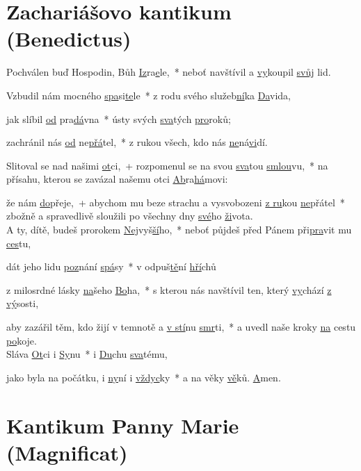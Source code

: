 \documentclass[12pt, a4paper]{article}
\begin{document}
\section*{Zachariášovo kantikum (Benedictus)}

Pochválen buď Hospodin, Bůh \underline{Iz}ra\underline{e}le,~* neboť navštívil a \underline{vy}koupil \underline{svůj} lid.

Vzbudil nám mocného \underline{spa}si\underline{te}le~* z rodu svého služeb\underline{ní}ka \underline{Da}vida,

jak slíbil \underline{od} pra\underline{dá}vna~* ústy svých \underline{sva}tých \underline{pro}roků;

zachránil nás \underline{od} ne\underline{přá}tel,~* z rukou všech, kdo nás \underline{ne}ná\underline{vi}dí.

Slitoval se nad našimi \underline{ot}ci,~+ rozpomenul se na svou \underline{sva}tou \underline{smlou}vu,~* na přísahu, kterou se zavázal našemu otci \underline{Ab}ra\underline{há}movi:

že nám \underline{do}přeje,~+ abychom mu beze strachu a vysvobozeni \underline{z ru}kou \underline{ne}přátel~* zbožně a spravedlivě sloužili po všechny dny \underline{své}ho \underline{ži}vota.\\



A ty, dítě, budeš prorokem \underline{Nej}vyš\underline{ší}ho,~* neboť půjdeš před Pánem při\underline{pra}vit mu \underline{ces}tu,

dát jeho lidu \underline{poz}nání \underline{spá}sy~* v odpuš\underline{tě}ní \underline{hří}chů

z milosrdné lásky \underline{na}šeho \underline{Bo}ha,~* s kterou nás navštívil ten, který \underline{vy}chází \underline{z vý}sosti,

aby zazářil těm, kdo žijí v temnotě a \underline{v stí}nu \underline{smr}ti,~* a uvedl naše kroky \underline{na} cestu \underline{po}koje.\\



Sláva \underline{Ot}ci i \underline{Sy}nu~* i \underline{Du}chu \underline{sva}tému,

jako byla na počátku, i \underline{ny}ní i \underline{vždyc}ky~* a na věky \underline{vě}ků. \underline{A}men.

\pagebreak

\section*{Kantikum Panny Marie (Magnificat)}
\end{document}
